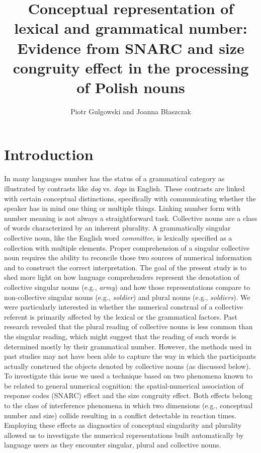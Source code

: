 \documentclass[output=paper]{langscibook}
\author{Piotr Gulgowski\affiliation{University of Wrocław} and  Joanna Błaszczak\affiliation{University of Wrocław}}
\title[Conceptual representation of lexical and grammatical number]{Conceptual representation of lexical and grammatical number: Evidence from SNARC and size congruity effect in the processing of Polish nouns}
\begin{document}
\maketitle

\section{Introduction} 
In many languages number has the status of a grammatical category as illustrated by contrasts like \textit{dog} vs. \textit{dogs} in English. These contrasts are linked with certain conceptual distinctions, specifically with communicating whether the speaker has in mind one thing or multiple things. Linking number form with number meaning is not always a straightforward task. Collective nouns are a class of words characterized by an inherent plurality. A grammatically singular collective noun, like the English word \textit{committee}, is lexically specified as a collection with multiple elements. Proper comprehension of a singular collective noun requires the ability to reconcile those two sources of numerical information and to construct the correct interpretation. The goal of the present study is to shed more light on how language comprehenders represent the denotation of collective singular nouns (e.g., \textit{army}) and how those representations compare to non-collective singular nouns (e.g., \textit{soldier}) and plural nouns (e.g., \textit{soldiers}). We were particularly interested in whether the numerical construal of a collective referent is primarily affected by the lexical or the grammatical factors. Past research \citep{bockMeaningSoundSyntax1993,bockNumberAgreementBritish2006,nenonenMismatchesGrammaticalNumber2010} revealed that the plural reading of collective nouns is less common than the singular reading, which might suggest that the reading of such words is determined mostly by their grammatical number. However, the methods used in past studies may not have been able to capture the way in which the participants actually construed the objects denoted by collective nouns (as discussed below). To investigate this issue we used a technique based on two phenomena known to be related to general numerical cognition: the spatial-numerical association of response codes (SNARC) effect and the size congruity effect. Both effects belong to the class of interference phenomena in which two dimensions (e.g., conceptual number and size) collide resulting in a conflict detectable in reaction times. Employing these effects as diagnostics of conceptual singularity and plurality allowed us to investigate the numerical representations built automatically by language users as they encounter singular, plural and collective nouns. 
\end{document}
